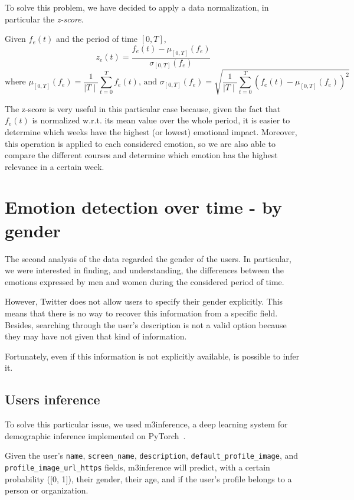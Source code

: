 To solve this problem, we have decided to apply a data normalization, in particular the \textit{z-score}.

\begin{definition}
\label{def:z-score}
	Given \(f_e(t)\) and the period of time \([0,T]\),   
	\[z_e(t) = \frac{f_e(t) - \mu_{[0,T]}(f_e)}{\sigma_{[0,T]}(f_e)}\] 
	\[\text{where } \mu_{[0,T]}(f_e) = \frac{1}{\mid T \mid} \sum_{t =0}^{T} f_e(t) \text{, and } \sigma_{[0,T]}(f_e) = \sqrt{\frac{1}{\mid T \mid} \sum_{t = 0}^{T} \left( f_e(t) - \mu_{[0,T]}(f_e) \right)^2 }\] 
\end{definition}

The z-score is very useful in this particular case because, given the fact that \(f_e(t)\) is normalized w.r.t. its mean value over the whole period, it is easier to determine which weeks have the highest (or lowest) emotional impact. Moreover, this operation is applied to each considered emotion, so we are also able to compare the different courses and determine which emotion has the highest relevance in a certain week.

\section{Emotion detection over time - by gender}
\label{sec:emotion-by-gender}

The second analysis of the data regarded the gender of the users. In particular, we were interested in finding, and understanding, the differences between the emotions expressed by men and women during the considered period of time.

However, Twitter does not allow users to specify their gender explicitly. This means that there is no way to recover this information from a specific field. Besides, searching through the user's description is not a valid option because they may have not given that kind of information. 

Fortunately, even if this information is not explicitly available, is possible to infer it. 

\subsection{Users inference}
\label{subsec:m3inference}

To solve this particular issue, we used m3inference, a deep learning system for demographic inference implemented on PyTorch~\cite{wang2019demographic}.

Given the user's \texttt{name}, \texttt{screen\_name}, \texttt{description}, \texttt{default\_profile\_image}, and \\
\texttt{profile\_image\_url\_https} fields, m3inference will predict, with a certain probability ([0, 1]), their gender, their age, and if the user's profile belongs to a person or organization.

